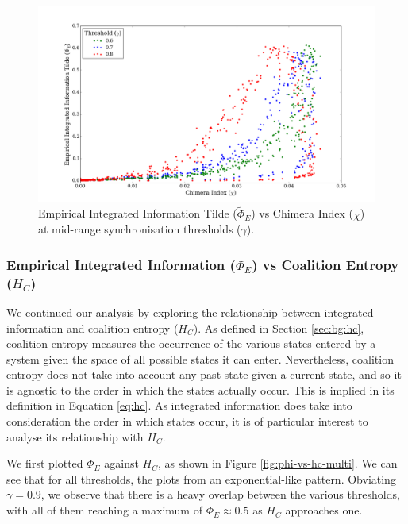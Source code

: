 \documentclass[a4paper,11pt]{article}
\begin{document}
\begin{figure}[H]
\begin{center}
\includegraphics[scale = 0.35]{figures/phi_tilde_vs_chi_mid}
\caption{
	Empirical Integrated Information Tilde ($\widetilde{\Phi}_E$) vs Chimera Index ($\chi$) at mid-range synchronisation thresholds ($\gamma$).
	\label{fig:phi-tilde-vs-chi-mid}
}
\end{center}
\end{figure}

\subsubsection{Empirical Integrated Information ($\Phi_{E}$) vs Coalition Entropy ($H_C$)}
\label{sec:app:osc:res:phi-v-hc}

We continued our analysis by exploring the relationship between integrated information and coalition entropy ($H_C$). As defined in Section \ref{sec:bg:hc}, coalition entropy measures the occurrence of the various states entered by a system given the space of all possible states it can enter. Nevertheless, coalition entropy does not take into account any past state given a current state, and so it is agnostic to the order in which the states actually occur. This is implied in its definition in Equation \ref{eq:hc}. As integrated information does take into consideration the order in which states occur, it is of particular interest to analyse its relationship with $H_C$.

We first plotted $\Phi_E$ against $H_C$, as shown in Figure \ref{fig:phi-vs-hc-multi}. We can see that for all thresholds, the plots from an exponential-like pattern. Obviating $\gamma = 0.9$, we observe that there is a heavy overlap between the various thresholds, with all of them reaching a maximum of $\Phi_E \approx 0.5$ as $H_C$ approaches one.
\end{document}
